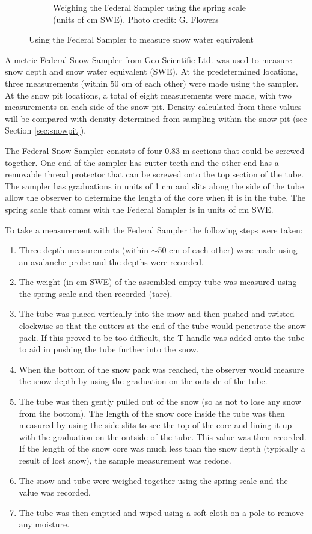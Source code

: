 \documentclass{sfuthesis}
\begin{document}
\begin{figure}[H]
\begin{subfigure}[b]{0.55\textwidth}
        \caption{Weighing the Federal Sampler using the spring scale (units of cm SWE). Photo credit: G. Flowers}
        \label{photo_swe2}
    \end{subfigure}

    \caption{Using the Federal Sampler to measure snow water equivalent}
    \label{photo_swe}
\end{figure}
 
A metric Federal Snow Sampler from Geo Scientific Ltd. was used to measure snow depth and snow water equivalent (SWE). At the predetermined locations, three measurements (within 50 cm of each other) were made using the sampler. At the snow pit locations, a total of eight measurements were made, with two measurements on each side of the snow pit. Density calculated from these values will be compared with density determined from sampling within the snow pit (see Section \ref{sec:snowpit}). 

The Federal Snow Sampler consists of four 0.83 m sections that could be screwed together. One end of the sampler has cutter teeth and the other end has a removable thread protector that can be screwed onto the top section of the tube. The sampler has graduations in units of 1 cm and slits along the side of the tube allow the observer to determine the length of the core when it is in the tube. The spring scale that comes with the Federal Sampler is in units of cm SWE.  

To take a measurement with the Federal Sampler the following steps were taken:
\begin{enumerate}
\item Three depth measurements (within $\sim$50 cm of each other) were made using an avalanche probe and the depths were recorded.
\item The weight (in cm SWE) of the assembled empty tube was measured using the spring scale and then recorded (tare).
\item The tube was placed vertically into the snow and then pushed and twisted clockwise so that the cutters at the end of the tube would penetrate the snow pack. If this proved to be too difficult, the T-handle was added onto the tube to aid in pushing the tube further into the snow. 
\item When the bottom of the snow pack was reached, the observer would measure the snow depth by using the graduation on the outside of the tube.
\item The tube was then gently pulled out of the snow (so as not to lose any snow from the bottom). The length of the snow core inside the tube was then measured by using the side slits to see the top of the core and lining it up with the graduation on the outside of the tube. This value was then recorded. If the length of the snow core was much less than the snow depth (typically a result of lost snow), the sample measurement was redone.
\item The snow and tube were weighed together using the spring scale and the value was recorded.
\item The tube was then emptied and wiped using a soft cloth on a pole to remove any moisture. 
\end{enumerate}
\end{document}
